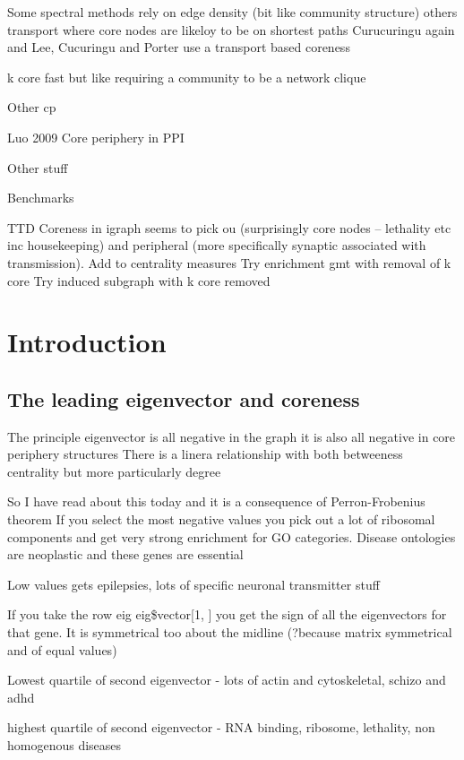 Some spectral methods rely on edge density (bit like community structure)
others transport where core nodes are likeloy to be on shortest paths
Curucuringu again and Lee, Cucuringu and Porter use a transport based coreness

k core fast but like requiring a community to be a network clique



Other cp

Luo 2009 Core periphery in PPI

Other stuff

Benchmarks


TTD
Coreness in igraph seems to pick ou (surprisingly core nodes – lethality etc inc housekeeping) and peripheral (more specifically synaptic associated with transmission).
Add to centrality measures
Try enrichment gmt with removal of k core
Try induced subgraph with k core removed



\section{Introduction}
\subsection{The leading eigenvector and coreness}
The principle eigenvector is all negative in the graph it is also all negative in core periphery structures
There is a linera relationship with both betweeness centrality but more particularly degree

So I have read about this today and it is a consequence of Perron-Frobenius theorem
If you select the most negative values you pick out a lot of ribosomal components and get very strong enrichment for GO categories.
Disease ontologies are neoplastic and these genes are essential

Low values gets epilepsies, lots of specific neuronal transmitter stuff

If you take the row eig eig\$vector[1, ] you get the sign of all the eigenvectors for that gene. It is symmetrical too about the midline (?because matrix symmetrical and of equal values)

Lowest quartile of second eigenvector - lots of actin and cytoskeletal, schizo and adhd

highest quartile of second eigenvector - RNA binding, ribosome, lethality, non homogenous diseases


